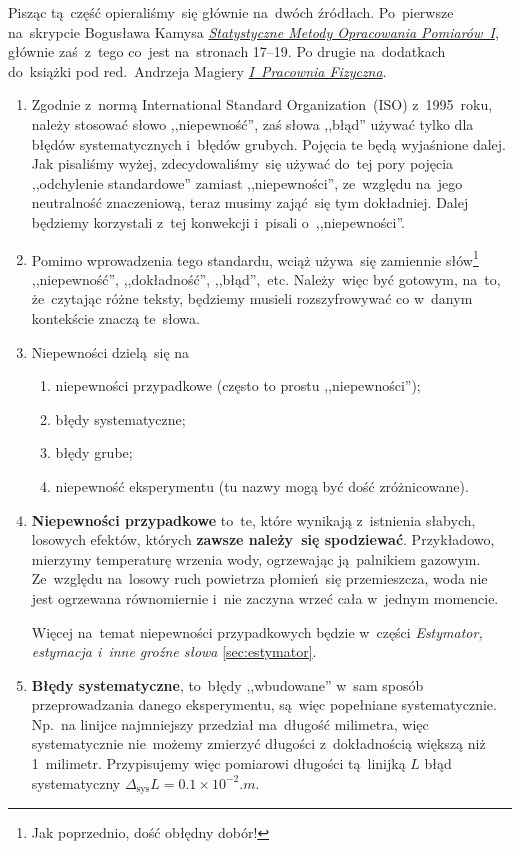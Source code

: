 \documentclass[a4paper,11pt]{article}
\newcommand{\tb}{\textbf}
\begin{document}
Pisząc tą~część opieraliśmy~się głównie na~dwóch źródłach. Po~pierwsze
na~skrypcie Bogusława Kamysa
\href{http://users.uj.edu.pl/\~ufkamys/BK/smop1N\_h.pdf}{\emph{Statystyczne
    Metody Opracowania Pomiarów~I}}, głównie zaś~z~tego co~jest
na~stronach 17--19. Po drugie na~dodatkach do~książki pod
red.~Andrzeja Magiery
\href{http://www.1pf.if.uj.edu.pl/documents/5046939/5227638/skrypt.pdf}{\emph{I~Pracownia
    Fizyczna}}.

\begin{enumerate}
\item Zgodnie z~normą International Standard Organization~(ISO)
  z~1995~roku, należy stosować słowo ,,niepewność'', zaś słowa
  ,,błąd'' używać tylko dla błędów systematycznych i~błędów grubych.
  Pojęcia te będą wyjaśnione dalej. Jak pisaliśmy wyżej,
  zdecydowaliśmy~się używać do~tej pory pojęcia ,,odchylenie
  standardowe'' zamiast ,,niepewności'', ze~względu na~jego
  neutralność znaczeniową, teraz musimy zająć~się tym dokładniej.
  Dalej będziemy korzystali z~tej konwekcji i~pisali
  o~,,niepewności''.
\item Pomimo wprowadzenia tego standardu, wciąż używa~się zamiennie
  słów\footnote{Jak poprzednio, dość obłędny dobór!} ,,niepewność'',
  ,,dokładność'', ,,błąd'',~etc. Należy~więc być gotowym, na~to,
  że~czytając różne teksty, będziemy musieli rozszyfrowywać co w~danym
  kontekście znaczą te~słowa.
\item Niepewności dzielą~się na
  \begin{enumerate}
  \item niepewności przypadkowe (często to prostu ,,niepewności'');
  \item błędy systematyczne;
  \item błędy grube;
  \item niepewność eksperymentu (tu nazwy mogą być dość zróżnicowane).
  \end{enumerate}
\item \textbf{Niepewności przypadkowe} to~te, które wynikają
  z~istnienia słabych, losowych efektów, których \tb{zawsze należy~się
    spodziewać}. Przykładowo, mierzymy temperaturę wrzenia wody,
  ogrzewając ją~palnikiem gazowym. Ze~względu na~losowy ruch powietrza
  płomień~się przemieszcza, woda nie jest ogrzewana równomiernie i~nie
  zaczyna wrzeć cała w~jednym momencie.

  Więcej na~temat niepewności przypadkowych będzie w~części
  \emph{Estymator, estymacja i~inne groźne słowa}
  \eqref{sec:estymator}.
\item \textbf{Błędy systematyczne}, to~błędy ,,wbudowane'' w~sam
  sposób przeprowadzania danego eksperymentu, są~więc popełniane
  systematycznie. Np.~na linijce najmniejszy przedział ma~długość
  milimetra, więc systematycznie nie~możemy zmierzyć długości
  z~dokładnością większą niż 1~milimetr. Przypisujemy więc pomiarowi
  długości tą~linijką $L$ błąd systematyczny
  $\Delta_{ \textrm{sys} } L = 0.1 \times 10^{ -2 } \si{.m}$.
  

\end{enumerate}
\end{document}
